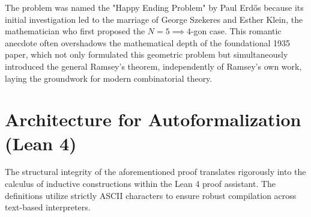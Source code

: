 \documentclass[11pt,a4paper]{article}
\begin{document}
The problem was named the "Happy Ending Problem" by Paul Erd\H{o}s because its initial investigation led to the marriage of George Szekeres and Esther Klein, the mathematician who first proposed the $N=5 \implies 4$-gon case.
This romantic anecdote often overshadows the mathematical depth of the foundational 1935 paper, which not only formulated this geometric problem but simultaneously introduced the general Ramsey's theorem, independently of Ramsey's own work, laying the groundwork for modern combinatorial theory.

\section{Architecture for Autoformalization (Lean 4)}

The structural integrity of the aforementioned proof translates rigorously into the calculus of inductive constructions within the Lean 4 proof assistant. The definitions utilize strictly ASCII characters to ensure robust compilation across text-based interpreters.
\end{document}
